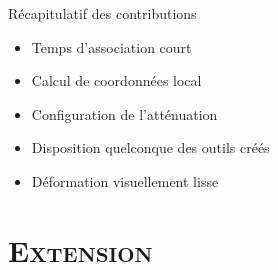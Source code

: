 \documentclass[xcolor=x11names,compress]{beamer}
\renewcommand{\(}{\begin{columns}} \renewcommand{\)}{\end{columns}}
\newcommand{\<}[1]{\begin{column}{#1}} \renewcommand{\>}{\end{column}}
\begin{document}
\begin{frame}{Récapitulatif des contributions}
  \begin{itemize}
    \item Temps d'association court
    \item Calcul de coordonnées local
    \item Configuration de l'atténuation
    \item Disposition quelconque des outils créés
    \item Déformation visuellement lisse
  \end{itemize}
\end{frame}

\section{\scshape Extension}
\end{document}
